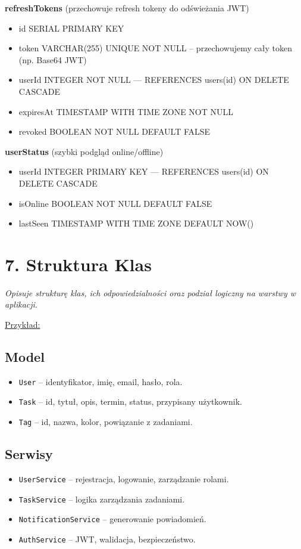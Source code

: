 \documentclass[a4paper,12pt]{article}
\begin{document}
\textbf{refreshTokens} (przechowuje refresh tokeny do odświeżania JWT)
\begin{itemize}
    \item id SERIAL PRIMARY KEY
    \item token VARCHAR(255) UNIQUE NOT NULL  – przechowujemy cały token (np. Base64 JWT)
    \item userId INTEGER NOT NULL  — REFERENCES users(id) ON DELETE CASCADE
    \item expiresAt TIMESTAMP WITH TIME ZONE NOT NULL
    \item revoked BOOLEAN NOT NULL DEFAULT FALSE
\end{itemize}

\textbf{userStatus} (szybki podgląd online/offline)
\begin{itemize}
    \item userId INTEGER PRIMARY KEY — REFERENCES users(id) ON DELETE CASCADE
    \item isOnline BOOLEAN NOT NULL DEFAULT FALSE
    \item lastSeen TIMESTAMP WITH TIME ZONE DEFAULT NOW()
\end{itemize}



\section*{7. Struktura Klas}
\textit{Opisuje strukturę klas, ich odpowiedzialności oraz podział logiczny na warstwy w aplikacji.}

\vspace{0.5 cm}
 \noindent
\underline{Przykład:} 
\vspace{0.5 cm}
 \noindent
\subsection*{Model}
\begin{itemize}
    \item \texttt{User} – identyfikator, imię, email, hasło, rola.
    \item \texttt{Task} – id, tytuł, opis, termin, status, przypisany użytkownik.
    \item \texttt{Tag} – id, nazwa, kolor, powiązanie z zadaniami.
\end{itemize}

\subsection*{Serwisy}
\begin{itemize}
    \item \texttt{UserService} – rejestracja, logowanie, zarządzanie rolami.
    \item \texttt{TaskService} – logika zarządzania zadaniami.
    \item \texttt{NotificationService} – generowanie powiadomień.
    \item \texttt{AuthService} – JWT, walidacja, bezpieczeństwo.
\end{itemize}
\end{document}
